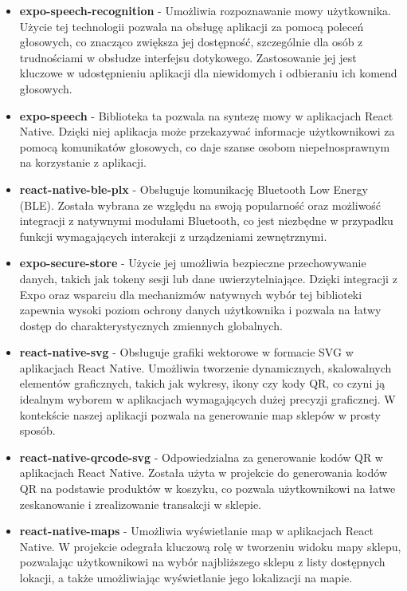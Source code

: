 \begin{itemize}
    \item \textbf{expo-speech-recognition} - Umożliwia rozpoznawanie mowy użytkownika. Użycie tej technologii pozwala na obsługę aplikacji za pomocą poleceń głosowych, co znacząco zwiększa jej dostępność, szczególnie dla osób z trudnościami w obsłudze interfejsu dotykowego. Zastosowanie jej jest kluczowe w udostępnieniu aplikacji dla niewidomych i odbieraniu ich komend głosowych.
    \item \textbf{expo-speech} - Biblioteka ta pozwala na syntezę mowy w aplikacjach React Native. Dzięki niej aplikacja może przekazywać informacje użytkownikowi za pomocą komunikatów głosowych, co daje szanse osobom niepełnosprawnym na korzystanie z aplikacji.
    \item \textbf{react-native-ble-plx} - Obsługuje komunikację Bluetooth Low Energy (BLE). Została wybrana ze względu na swoją popularność oraz możliwość integracji z natywnymi modułami Bluetooth, co jest niezbędne w przypadku funkcji wymagających interakcji z urządzeniami zewnętrznymi.
    \item \textbf{expo-secure-store} - Użycie jej umożliwia bezpieczne przechowywanie danych, takich jak tokeny sesji lub dane uwierzytelniające. Dzięki integracji z Expo oraz wsparciu dla mechanizmów natywnych wybór tej biblioteki zapewnia wysoki poziom ochrony danych użytkownika i pozwala na łatwy dostęp do charakterystycznych zmiennych globalnych.
    \item \textbf{react-native-svg} - Obsługuje grafiki wektorowe w formacie SVG w aplikacjach React Native. Umożliwia tworzenie dynamicznych, skalowalnych elementów graficznych, takich jak wykresy, ikony czy kody QR, co czyni ją idealnym wyborem w aplikacjach wymagających dużej precyzji graficznej. W kontekście naszej aplikacji pozwala na generowanie map sklepów w prosty sposób.
    \item \textbf{react-native-qrcode-svg} - Odpowiedzialna za generowanie kodów QR w aplikacjach React Native. Została użyta w projekcie do generowania kodów QR na podstawie produktów w koszyku, co pozwala użytkownikowi na łatwe zeskanowanie i zrealizowanie transakcji w sklepie.
    \item \textbf{react-native-maps} - Umożliwia wyświetlanie map w aplikacjach React Native. W projekcie odegrała kluczową rolę w tworzeniu widoku mapy sklepu, pozwalając użytkownikowi na wybór najbliższego sklepu z listy dostępnych lokacji, a także umożliwiając wyświetlanie jego lokalizacji na mapie.
\end{itemize}

